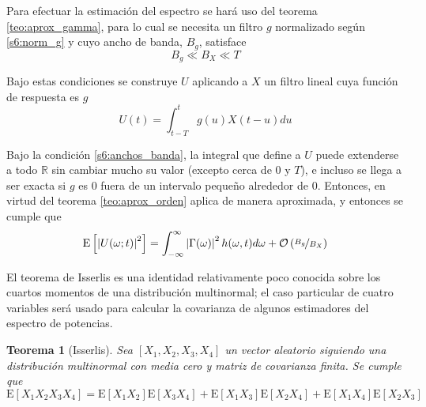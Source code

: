 \documentclass[12pt,letterpaper]{book}
\newtheorem{teorema}{Teorema}[chapter]
\newcommand{\R}{\mathbb{R}}
\newcommand{\intR}{\int_{-\infty}^{\infty}}
\newcommand{\E}[1]{\mathrm{E}\left[ #1 \right]}
\newcommand{\abso}[1]{\left| #1 \right|}
\newcommand{\orden}[1]{\mathcal{O}\left( #1 \right)}
\begin{document}
Para efectuar la estimación del espectro se hará uso del teorema \ref{teo:aprox_gamma}, para lo cual se necesita un filtro $g$ normalizado según \ref{s6:norm_g} y cuyo ancho de banda, $B_g$, satisface
\begin{equation}
B_g \ll B_X \ll T
\label{s6:anchos_banda}
\end{equation}

Bajo estas condiciones se construye $U$ aplicando a $X$ un filtro lineal cuya función de respuesta es $g$
\begin{equation}
U(t) = \int_{t-T}^{t} g(u) X(t-u) du
\end{equation}

Bajo la condición \ref{s6:anchos_banda}, la integral que define a $U$ puede extenderse a todo $\R$ sin cambiar mucho su valor (excepto cerca de 0 y $T$), e incluso se llega a ser exacta si $g$ es 0 fuera de un intervalo pequeño alrededor de 0. Entonces, en virtud del teorema \ref{teo:aprox_orden}
aplica de manera aproximada, y entonces se cumple que
\begin{equation}
\E{\abso{U(\omega; t)}^{2}} = \intR \abso{\Gamma(\omega)}^{2} h(\omega, t)d\omega + \orden{\nicefrac{B_g}{B_X}}
\end{equation}


El teorema de Isserlis es una identidad relativamente poco conocida sobre los cuartos momentos de una distribución multinormal; el caso particular de cuatro variables será usado para calcular la covarianza de algunos estimadores del espectro de potencias.

\begin{teorema}[Isserlis]
Sea $[X_1, X_2, X_3, X_4]$ un vector aleatorio siguiendo una distribución multinormal con media cero y matriz de covarianza finita. Se cumple que
\begin{equation}
\E{X_1 X_2 X_3 X_4} = \E{X_1 X_2} \E{X_3 X_4} + \E{X_1 X_3} \E{X_2 X_4} + \E{X_1 X_4} \E{X_2 X_3}
\end{equation}
\label{teo:isserlis}
\end{teorema}

%
\end{document}
